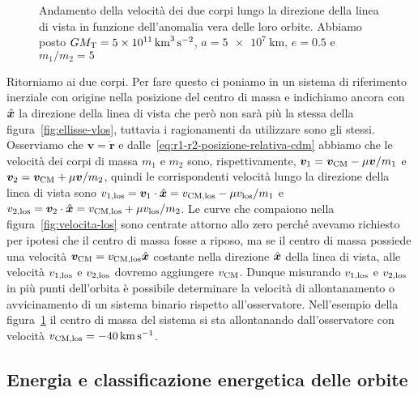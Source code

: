 {\begin{figure}
  \centering
  
  \caption[Andamento della velocità dei due corpi nella direzione della di vista
  in funzione dell'anomalia
  vera]{Andamento della velocità dei due corpi lungo la direzione della linea di
    vista in funzione dell'anomalia vera delle loro orbite. Abbiamo posto
    $GM_\textup{T} = \SI{5e11}{\cubic\kilo\metre\per\square\second}$,
    $a = \SI{5e7}{\kilo\metre}$, $e=0.5$ e $m_1/m_2=5$}
  \label{fig:velocita-los-due-corpi}
\end{figure}
Ritorniamo ai due corpi. Per fare questo ci poniamo in un sistema di riferimento
inerziale con origine nella posizione del centro di massa e indichiamo ancora
con $\hat{\bm{x}}$ la direzione della linea di vista che però non sarà più la
stessa della figura~\ref{fig:ellisse-vlos}, tuttavia i ragionamenti da
utilizzare sono gli stessi. Osserviamo che $\bm{v}=\dot{\bm{r}}$ e
dalle~\eqref{eq:r1-r2-posizione-relativa-cdm} abbiamo che le velocità dei corpi
di massa $m_1$ e $m_2$ sono, rispettivamente,
$\bm{v}_1 = \bm{v}_\textup{CM}-\mu\bm{v}/m_1$ e
$\bm{v}_2 = \bm{v}_\textup{CM} + \mu\bm{v}/m_2$, quindi le corrispondenti
velocità lungo la direzione della linea di vista sono
$v_{1,\textup{los}} = \bm{v}_1 \cdot \hat{\bm{x}} = v_\textup{CM,los}-\mu
v_\textup{los}/m_1$
e
$v_{2,\textup{los}} = \bm{v}_2 \cdot \hat{\bm{x}} = v_\textup{CM,los} + \mu
v_\textup{los}/m_2$.
Le curve che compaiono nella figura~\ref{fig:velocita-los} sono centrate attorno
allo zero perché avevamo richiesto per ipotesi che il centro di massa fosse a
riposo, ma se il centro di massa possiede una velocità
$\bm{v}_\textup{CM} = v_\textup{CM,los}\hat{\bm{x}}$ costante nella direzione
$\hat{\bm{x}}$ della linea di vista, alle velocità $v_{1,\textup{los}}$ e
$v_{2,\textup{los}}$ dovremo aggiungere $v_\textup{CM}$. Dunque misurando
$v_{1,\textup{los}}$ e $v_{2,\textup{los}}$ in più punti dell'orbita è possibile
determinare la velocità di allontanamento o avvicinamento di un sistema binario
rispetto all'osservatore. Nell'esempio della
figura~\ref{fig:velocita-los-due-corpi} il centro di massa del sistema si sta
allontanando dall'osservatore con velocità
$v_\textup{CM,los} = \SI{-40}{\kilo\metre\per\second}$.

\subsection{Energia e classificazione energetica delle orbite}
\label{sec:energia-orbite}

}
